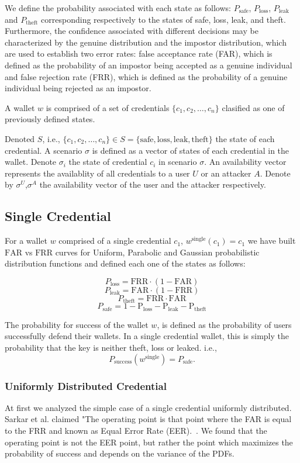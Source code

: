 \documentclass{article}
\begin{document}
We define the probability associated with each state as follows: $P_{\text{safe}}$, $P_{\text{loss}}$, $P_{\text{leak}}$ and $P_{\text{theft}}$ corresponding respectively to the states of safe, loss, leak, and theft. Furthermore, the confidence associated with different decisions may be characterized by the genuine distribution and the impostor distribution, which are used to establish two error rates: false acceptance rate (FAR), which is defined as the probability of an impostor being accepted as a genuine individual and false rejection rate (FRR), which is defined as the probability of a genuine individual being rejected as an impostor.

A wallet $w$ is comprised of a set of credentials $\{c_1, c_2, \ldots, c_n\}$ clasified as one of previously defined states.

Denoted $S$, i.e., $\{c_1, c_2, \ldots, c_n\} \in S = \{ \text{safe}, \text{loss}, \text{leak}, \text{theft} \}$ the state of each credential. A scenario $\sigma$ is defined as a vector of states of each credential in the wallet. Denote $\sigma_i$ the state of credential $c_i$ in scenario $\sigma$. An availability vector represents the availablity of all credentials to a user $U$ or an attacker $A$. Denote by $\sigma^U$,$\sigma^A$ the availability vector of the user and the attacker respectively.

\subsection{Single Credential}
For a wallet $w$ comprised of a single credential $c_1$, $w^\text{single}(c_1)=c_1$ we have built $\mathrm{FAR}$ vs $\mathrm{FRR}$ curves for Uniform, Parabolic and Gaussian probabilistic distribution functions and defined each one of the states as follows:

\[
P_{\text{loss}} = \mathrm{FRR} \cdot (1 - \mathrm{FAR})
\]
\[
P_{\text{leak}} = \mathrm{FAR} \cdot (1 - \mathrm{FRR})
\]
\[
P_{\text{theft}}=\mathrm{FRR} \cdot \mathrm{FAR}
\]
\[
P_{{\text{safe}}}=1-\mathrm{P_{\text{loss}}}-\mathrm{P_{\text{leak}}}-\mathrm{P_{\text{theft}}}
\]

The probability for success of the wallet $w$, is defined as the probability of users successfully defend their wallets. In a single credential wallet, this is simply the probability that the key is neither theft, loss or leaked. i.e.,
\[
P_{\text{success}}(w^{\text{single}}) = P_{{\text{safe}}}.
\]

\subsubsection{Uniformly Distributed Credential}
At first we analyzed the simple case of a single credential uniformly distributed. Sarkar et al. claimed "The operating point is that point where the FAR is equal to the FRR and known as Equal Error Rate (EER).~\cite{sarkar2020}. We found that the operating point is not the EER point, but rather the point which maximizes the probability of success and depends on the variance of the PDFs.
\end{document}
